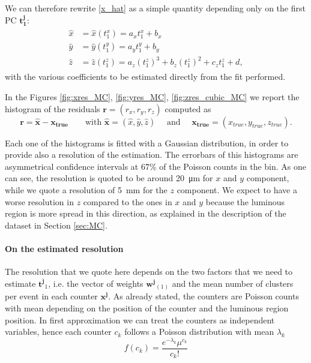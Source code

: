 We can therefore rewrite \eqref{x_hat} as a simple quantity depending only on the first PC $\mathbf{t^j_1}$:
\begin{align}
\begin{split}
    \hat{x} &= \hat{x}(t^x_1) = a_x t^x_1 + b_x \\
    \hat{y} &= \hat{y}(t^y_1) = a_y t^y_1 + b_y \\\label{x_hat_true}
    \hat{z} &= \hat{z}(t^z_1) = a_z (t^z_1)^3 + b_z (t^z_1)^2 + c_z  t^z_1 + d,
    \end{split}
\end{align} 
with the various coefficients to be estimated directly from the fit performed. 

In the Figures \ref{fig:xres_MC}, \ref{fig:yres_MC}, \ref{fig:zres_cubic_MC} we report the histogram of the residuals $\mathbf{r}=(r_x, r_y, r_z)$ computed as 
 \begin{equation}
     \mathbf{r}=\hat{\mathbf{x}} - \mathbf{x_{true}} \qquad \text{with } \hat{\mathbf{x}} = (\hat{x}, \hat{y}, \hat{z}) \quad \text{ and } \quad \mathbf{x_{true}}=(x_{true}, y_{true}, z_{true}).
 \end{equation}

 Each one of the histograms is fitted with a Gaussian distribution, in order to provide also a resolution of the estimation. The errorbars of this histograms are asymmetrical confidence intervals at $67$\% of the Poisson counts in the bin.
 As one can see, the resolution is quoted to be around \SI{20}{\micro\meter} for $x$ and $y$ component, while we quote a resolution of \SI{5}{\milli\meter} for the $z$ component. We expect to have a worse resolution in $z$ compared to the ones in $x$ and $y$ because the luminous region is more spread in this direction, as explained in the description of the dataset in Section \ref{sec:MC}.
 \paragraph{On the estimated resolution}
 The resolution that we quote here depends on the two factors that we need to estimate $\mathbf{t^{j}}_{1}$, i.e. the vector of weights $\mathbf{w^j}_{(1)}$ and the mean number of clusters per event in each counter $\mathbf{x^{j}}$. As already stated, the counters are Poisson counts with mean depending on the position of the counter and the luminous region position. In first approximation we can treat the counters as independent variables, hence each counter $c_k$ follows a Poisson distribution with mean $\lambda_k$
 \begin{equation}
     f(c_k) = \frac{e^{-\lambda_k} \mu^{c_k}}{c_k!}
 \end{equation}

